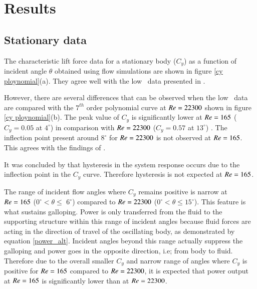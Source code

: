 \section{Results}
\label{sec:results}

\subsection{Stationary data}

The characteristic lift force data for a stationary body ($C_y$) as a function of incident angle $\theta$ obtained using flow simulations are shown in figure \ref{cy ploynomial}(a). They agree well with the low \reynoldsnumber\ data presented in \citet{Joly2012}.

However, there are several differences that can be observed when the low \reynoldsnumber\ data are compared with the $7^{th}$ order polynomial curve at $Re=22300$ shown in figure \ref{cy ploynomial}(b). The peak value of $C_y$ is  significantly lower at $Re=165$ ($C_y=0.05$ at $4^\circ$) in comparison with $Re=22300$ ($C_y=0.57$ at $13^\circ$) . The inflection point present around $8^\circ$ for $Re=22300$ is not observed at $Re=165$. This agrees with the findings of \cite{Luo2003}. 

It was concluded by \cite{Luo2003} that hysteresis in the system response occurs due to the inflection point in the $C_y$ curve. Therefore hysteresis is not expected at $Re=165$.

The range of incident flow angles where $C_y$ remains positive is narrow at $Re=165$ ($0^\circ <\theta \leq$ $6^\circ$) compared to $Re=22300$ ($0^\circ <\theta \leq 15^\circ$). This feature is what sustains galloping. Power is only transferred from the fluid to the supporting structure within this range of incident angles because fluid forces are acting in the direction of travel of the oscillating body, as demonstrated by equation \ref{power_alt}. Incident angles beyond this range actually suppress the galloping and power goes in the opposite direction, i.e; from body to fluid. Therefore due to the overall smaller $C_y$ and narrow range of angles where $C_y$ is positive for $Re=165$ compared to $Re=22300$, it is expected that power output at $Re=165$ is significantly lower than at $Re=22300$. 



